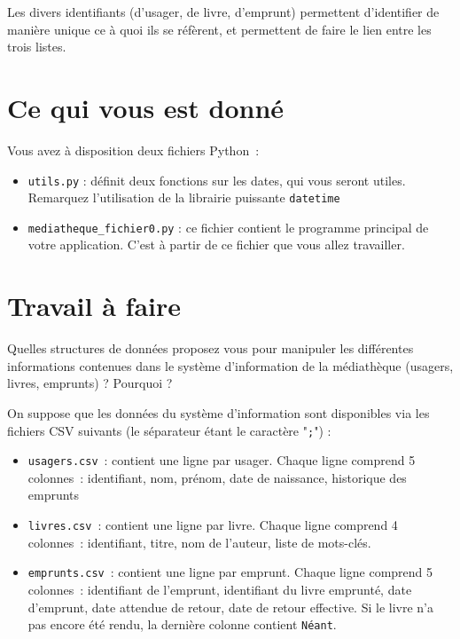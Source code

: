 \documentclass[10pt,a4paper]{sujets-exercices}
\begin{document}
Les divers identifiants (d'usager, de livre, d'emprunt) permettent d'identifier de manière unique ce à quoi ils se réfèrent, et permettent de faire le lien entre les trois listes. 

\section{Ce qui vous est donné}

Vous avez à disposition deux fichiers Python~:

\begin{itemize}
\item \texttt{utils.py} : définit deux fonctions sur les dates, qui vous seront utiles. Remarquez l'utilisation de la librairie puissante \texttt{datetime}
\item \texttt{mediatheque\_fichier0.py} : ce fichier contient le programme principal de votre application. C'est à partir de ce fichier que vous allez travailler. 
\end{itemize}

\section{Travail à faire}


Quelles structures de données proposez vous pour manipuler les différentes informations contenues dans le système d'information de la médiathèque (usagers, livres, emprunts) ? Pourquoi ?


On suppose que les données du système d'information sont disponibles via les fichiers CSV suivants (le séparateur étant le caractère "\verb!;!") : 

\begin{itemize}
\item \texttt{usagers.csv}~: contient une ligne par usager. Chaque ligne comprend 5 colonnes~: identifiant, nom, prénom, date de naissance, historique des emprunts
\item \texttt{livres.csv}~: contient une ligne par livre. Chaque ligne comprend 4 colonnes~: identifiant, titre, nom de l'auteur, liste de mots-clés.
\item \texttt{emprunts.csv}~: contient une ligne par emprunt. Chaque ligne comprend 5 colonnes~: identifiant de l'emprunt, identifiant du livre emprunté, date d'emprunt, date attendue de retour, date de retour effective. Si le livre n'a pas encore été rendu, la dernière colonne contient \texttt{Néant}. 
\end{itemize}
\end{document}
